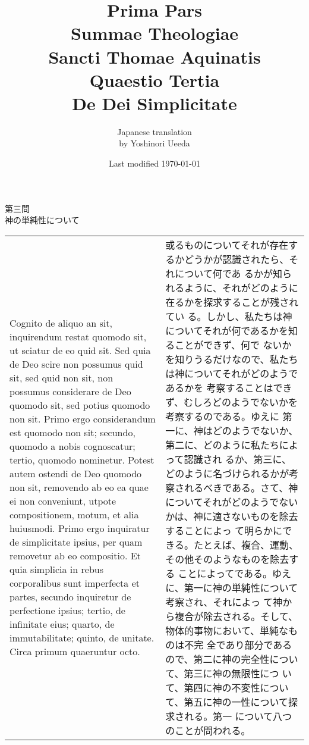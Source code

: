 \documentclass[10pt]{jsarticle} %
\title{{\bf Prima Pars}\\{\HUGE Summae Theologiae}\\Sancti Thomae
Aquinatis\\Quaestio Tertia\\{\bf De Dei Simplicitate}}
\author{Japanese translation\\by Yoshinori {\sc Ueeda}}
\date{Last modified \today}
\begin{document}
\maketitle

\begin{center}
 {\Large 第三問\\神の単純性について}
\end{center}


\begin{longtable}{p{21em}p{21em}}

Cognito de aliquo an sit, inquirendum restat quomodo sit, ut sciatur de
eo quid sit. Sed quia de Deo scire non possumus quid sit, sed quid non
sit, non possumus considerare de Deo quomodo sit, sed potius quomodo non
sit. Primo ergo considerandum est quomodo non sit; secundo, quomodo a
nobis cognoscatur; tertio, quomodo nominetur. Potest autem ostendi de
Deo quomodo non sit, removendo ab eo ea quae ei non conveniunt, utpote
compositionem, motum, et alia huiusmodi. Primo ergo inquiratur de
simplicitate ipsius, per quam removetur ab eo compositio. Et quia
simplicia in rebus corporalibus sunt imperfecta et partes, secundo
inquiretur de perfectione ipsius; tertio, de infinitate eius; quarto, de
immutabilitate; quinto, de unitate. Circa primum quaeruntur octo. 


&
或るものについてそれが存在するかどうかが認識されたら、それについて何であ
 るかが知られるように、それがどのように在るかを探求することが残されてい
 る。しかし、私たちは神についてそれが何であるかを知ることができず、何で
 ないかを知りうるだけなので、私たちは神についてそれがどのようであるかを
 考察することはできず、むしろどのようでないかを考察するのである。ゆえに
 第一に、神はどのようでないか、第二に、どのように私たちによって認識され
 るか、第三に、どのように名づけられるかが考察されるべきである。さて、神
 についてそれがどのようでないかは、神に適さないものを除去することによっ
 て明らかにできる。たとえば、複合、運動、その他そのようなものを除去する
 ことによってである。ゆえに、第一に神の単純性について考察され、それによっ
 て神から複合が除去される。そして、物体的事物において、単純なものは不完
 全であり部分であるので、第二に神の完全性について、第三に神の無限性につ
 いて、第四に神の不変性について、第五に神の一性について探求される。第一
 について八つのことが問われる。

\\


\end{longtable}
\end{document}
